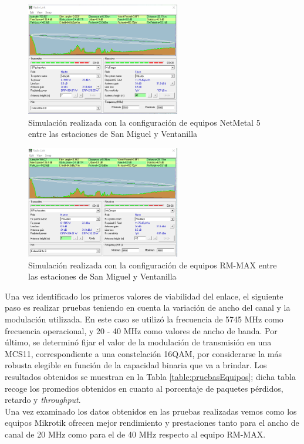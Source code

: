   \begin{figure}[H]
			\centering
			\includegraphics[width=0.6\textwidth]{img/Mikrotik_pruebas.png}
			\caption{Simulación realizada con la configuración de equipos NetMetal 5 entre las estaciones de San Miguel y Ventanilla}
			\label{mikro_sanmiguel}
\end{figure}
 \begin{figure}[H]
			\centering
			\includegraphics[width=0.6\textwidth]{img/rmmax_pruebas.png}
			\caption{Simulación realizada con la configuración de equipos RM-MAX entre las estaciones de San Miguel y Ventanilla}
			\label{mikro_rmmax}
\end{figure}
 Una vez identificado los primeros valores de viabilidad del enlace, el siguiente paso es realizar pruebas teniendo en cuenta la variación de ancho del canal y la modulación utilizada. En este caso se utilizó la frecuencia de 5745 MHz como frecuencia operacional, y 20 - 40 MHz como valores de ancho de banda. Por último, se determinó fijar el valor de la modulación de transmisión en una MCS11, correspondiente a una constelación 16QAM, por considerarse la más robusta elegible en función de la capacidad binaria que va a brindar. Los resultados obtenidos se muestran en la Tabla \ref{table:pruebasEquipos}; dicha tabla recoge los promedios obtenidos en cuanto al porcentaje de paquetes pérdidos, retardo y \textit{throughput}.\\ 
Una vez examinado los datos obtenidos en las pruebas realizadas vemos como los equipos Mikrotik ofrecen mejor rendimiento y prestaciones tanto para el ancho de canal de 20 MHz como para el de 40 MHz respecto al equipo RM-MAX. \\


